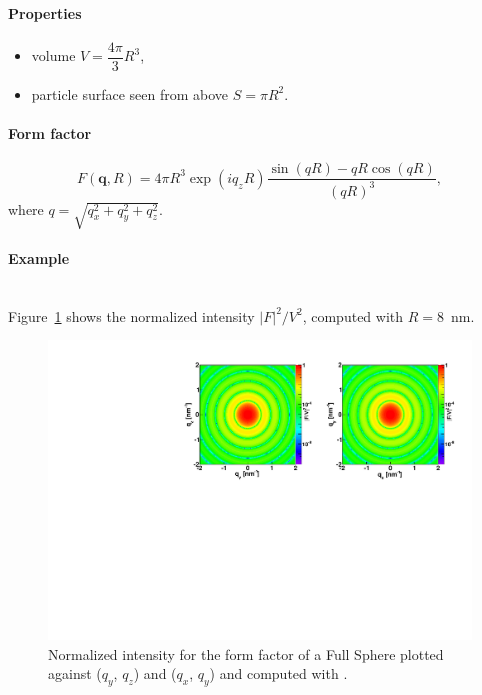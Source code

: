 \paragraph{Properties}
\begin{itemize}
\item volume $V = \dfrac{4\pi}{3}R^3$,
\item particle surface seen from above $S= \pi R^2$.
\end{itemize}

\paragraph{Form factor}
\begin{equation*}
F(\mathbf{q},R) = 4\pi R^3 \exp(iq_z R)\frac{\sin(q R) - q R \cos(q R)}{(qR)^3},
\end{equation*}
where $q=\sqrt{q_x^2 + q_y^2 + q_z^2}$.


\paragraph{Example}\strut\\
Figure~\ref{fig:FFfSphereEx} shows the normalized intensity $|F|^2/V^2$, computed with $R=8$~nm.
\begin{figure}[h]
\begin{center}
\includegraphics[angle=-90,width=\textwidth]{fig/ff/figfffsphere.pdf}
\end{center}
\caption{Normalized intensity for the
  form factor of a Full Sphere plotted against ($q_y$, $q_z$) and ($q_x$, $q_y$) and computed with .}
\label{fig:FFfSphereEx}
\end{figure}

